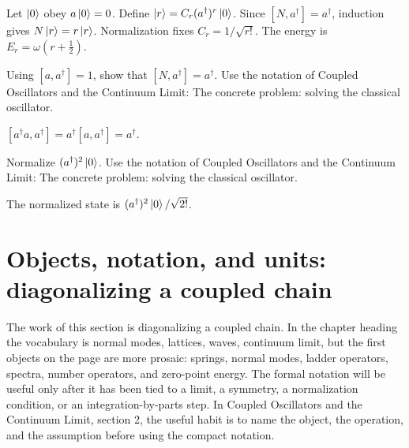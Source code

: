 \begin{example}
Let \(\left|0\right\rangle\) obey \(a\left|0\right\rangle=0\).  Define \(\left|r\right\rangle=C_r(a^\dagger)^r\left|0\right\rangle\).  Since \([N,a^\dagger]=a^\dagger\), induction gives \(N\left|r\right\rangle=r\left|r\right\rangle\).  Normalization fixes \(C_r=1/\sqrt{r!}\).  The energy is \(E_r=\omega(r+\frac12)\).
\end{example}



\begin{exercise}
Using \([a,a^\dagger]=1\), show that \([N,a^\dagger]=a^\dagger\).  Use the notation of Coupled Oscillators and the Continuum Limit: The concrete problem: solving the classical oscillator.
\begin{answer}
\([a^\dagger a,a^\dagger]=a^\dagger[a,a^\dagger]=a^\dagger\).
\end{answer}
\end{exercise}

\begin{exercise}
Normalize \((a^\dagger)^2\left|0\right\rangle\).  Use the notation of Coupled Oscillators and the Continuum Limit: The concrete problem: solving the classical oscillator.
\begin{answer}
The normalized state is \((a^\dagger)^2\left|0\right\rangle/\sqrt{2!}\).
\end{answer}
\end{exercise}



\section{Objects, notation, and units: diagonalizing a coupled chain}













The work of this section is diagonalizing a coupled chain.  In the chapter heading the vocabulary is normal modes, lattices, waves, continuum limit, but the first objects on the page are more prosaic: springs, normal modes, ladder operators, spectra, number operators, and zero-point energy.  The formal notation will be useful only after it has been tied to a limit, a symmetry, a normalization condition, or an integration-by-parts step.  In Coupled Oscillators and the Continuum Limit, section 2, the useful habit is to name the object, the operation, and the assumption before using the compact notation.

